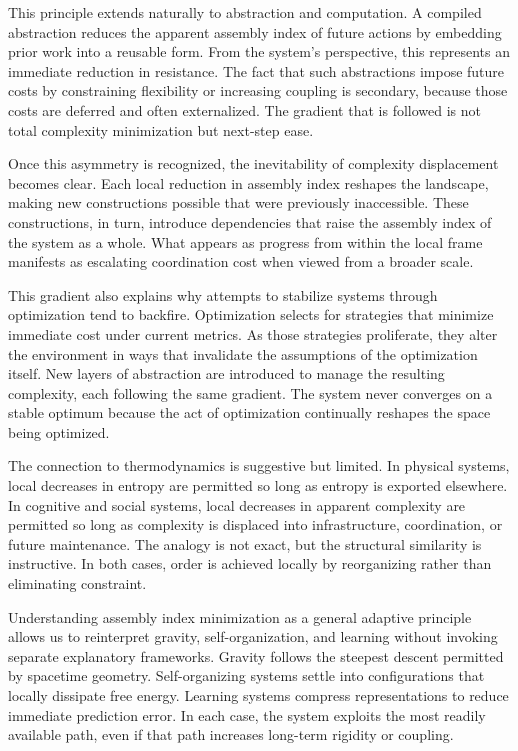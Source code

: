 \documentclass[12pt]{article}
\begin{document}
This principle extends naturally to abstraction and computation. A compiled abstraction reduces the apparent assembly index of future actions by embedding prior work into a reusable form. From the system’s perspective, this represents an immediate reduction in resistance. The fact that such abstractions impose future costs by constraining flexibility or increasing coupling is secondary, because those costs are deferred and often externalized. The gradient that is followed is not total complexity minimization but next-step ease.

Once this asymmetry is recognized, the inevitability of complexity displacement becomes clear. Each local reduction in assembly index reshapes the landscape, making new constructions possible that were previously inaccessible. These constructions, in turn, introduce dependencies that raise the assembly index of the system as a whole. What appears as progress from within the local frame manifests as escalating coordination cost when viewed from a broader scale.

This gradient also explains why attempts to stabilize systems through optimization tend to backfire. Optimization selects for strategies that minimize immediate cost under current metrics. As those strategies proliferate, they alter the environment in ways that invalidate the assumptions of the optimization itself. New layers of abstraction are introduced to manage the resulting complexity, each following the same gradient. The system never converges on a stable optimum because the act of optimization continually reshapes the space being optimized.

The connection to thermodynamics is suggestive but limited. In physical systems, local decreases in entropy are permitted so long as entropy is exported elsewhere. In cognitive and social systems, local decreases in apparent complexity are permitted so long as complexity is displaced into infrastructure, coordination, or future maintenance. The analogy is not exact, but the structural similarity is instructive. In both cases, order is achieved locally by reorganizing rather than eliminating constraint.

Understanding assembly index minimization as a general adaptive principle allows us to reinterpret gravity, self-organization, and learning without invoking separate explanatory frameworks. Gravity follows the steepest descent permitted by spacetime geometry. Self-organizing systems settle into configurations that locally dissipate free energy. Learning systems compress representations to reduce immediate prediction error. In each case, the system exploits the most readily available path, even if that path increases long-term rigidity or coupling.
\end{document}
